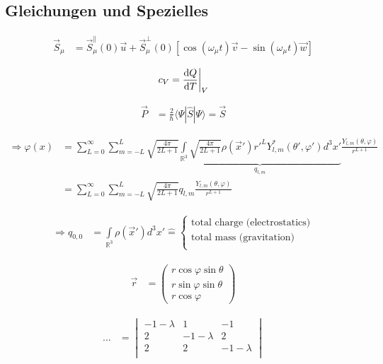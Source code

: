 \documentclass[12pt, a4paper, twopage]{scrartcl}
\newcommand{\entspricht}{\mathrel{\widehat{=}}}
\begin{document}
\subsection{Gleichungen und Spezielles}
\begin{align}
	 \vec{S}_\mu &= \vec{S}_\mu ^{\parallel}(0) \vec{u} + \vec{S}_\mu^{\bot} (0) [\cos(\omega_\mu t)\vec{v} - \sin(\omega_\mu t)\vec{w}]
\end{align}

\begin{align}
	c_V = \frac{\mathrm{d} Q}{\mathrm{d} T} \bigg{\rvert}_V
\end{align}

\begin{align}
	 \vec{P} &= \frac{2}{\hbar} \langle \Psi | \hat{S} | \Psi \rangle = \vec{S}
\end{align}


\begin{align}
	 \Rightarrow \varphi (x) &= \sum\limits_{L = 0}^{\infty} \sum\limits_{m = - L}^{L} \sqrt{\frac{4 \pi}{2 L + 1}}  \underbrace{\int\limits_{\mathbb{R}^3} \sqrt{\frac{4 \pi}{2 L + 1}} \rho(\vec{x} ' ) r'^{L} Y_{l, m}^{*} (\theta ', \varphi ') d^3 x'}_{q_{l,m}}  \frac{Y_{l,m}(\theta, \varphi)}{r^ {L + 1}} \\ 
	 &= \sum\limits_{L = 0}^{\infty} \sum\limits_{m = - L}^{L} \sqrt{\frac{4 \pi}{2 L + 1}} q_{l,m}  \frac{Y_{l,m}(\theta, \varphi)}{r^ {L + 1}}
\end{align}


\begin{align}
	 \nonumber
	 \Rightarrow q_{0, 0} &= \int \limits_{\mathbb{R}^3} \rho(\vec{x}' ) d^3 x' \entspricht 
	 \begin{cases} 
	 \text{total charge (electrostatics)} \\
	 \text{total mass (gravitation)}\\
	 \end{cases}
\end{align}


\begin{align}
	 \vec{r} &= \left( \begin{matrix}
	 r \cos \varphi \sin \theta\\
	 r \sin \varphi \sin \theta\\
	 r \cos \varphi
	 \end{matrix} \right )
\end{align}


\begin{align}
	 ... &=\begin{vmatrix}
		  -1-\lambda & 1 & -1 \\
		  2 & -1-\lambda & 2\\
		  2 & 2 & -1-\lambda\\
		  \end{vmatrix}
\end{align}
\end{document}
